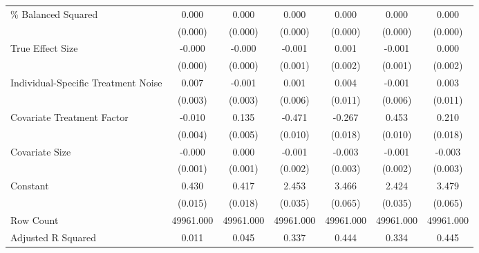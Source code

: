 \begin{table}[htbp]
\begin{tabular}{l*{6}{c}}
\% Balanced Squared &       0.000\sym{***}&       0.000\sym{***}&       0.000\sym{***}&       0.000\sym{***}&       0.000\sym{***}&       0.000\sym{***}\\
                    &     (0.000)         &     (0.000)         &     (0.000)         &     (0.000)         &     (0.000)         &     (0.000)         \\
True Effect Size    &      -0.000         &      -0.000         &      -0.001         &       0.001         &      -0.001         &       0.000         \\
                    &     (0.000)         &     (0.000)         &     (0.001)         &     (0.002)         &     (0.001)         &     (0.002)         \\
Individual-Specific Treatment Noise&       0.007\sym{**} &      -0.001         &       0.001         &       0.004         &      -0.001         &       0.003         \\
                    &     (0.003)         &     (0.003)         &     (0.006)         &     (0.011)         &     (0.006)         &     (0.011)         \\
Covariate Treatment Factor&      -0.010\sym{*}  &       0.135\sym{***}&      -0.471\sym{***}&      -0.267\sym{***}&       0.453\sym{***}&       0.210\sym{***}\\
                    &     (0.004)         &     (0.005)         &     (0.010)         &     (0.018)         &     (0.010)         &     (0.018)         \\
Covariate Size      &      -0.000         &       0.000         &      -0.001         &      -0.003         &      -0.001         &      -0.003         \\
                    &     (0.001)         &     (0.001)         &     (0.002)         &     (0.003)         &     (0.002)         &     (0.003)         \\
Constant            &       0.430\sym{***}&       0.417\sym{***}&       2.453\sym{***}&       3.466\sym{***}&       2.424\sym{***}&       3.479\sym{***}\\
                    &     (0.015)         &     (0.018)         &     (0.035)         &     (0.065)         &     (0.035)         &     (0.065)         \\
\hline
Row Count           &   49961.000         &   49961.000         &   49961.000         &   49961.000         &   49961.000         &   49961.000         \\
Adjusted R Squared  &       0.011         &       0.045         &       0.337         &       0.444         &       0.334         &       0.445         \\

\end{tabular}
\end{table}
